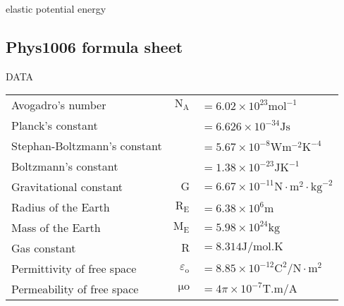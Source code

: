 \documentclass{extarticle}
\begin{document}
elastic potential energy












\subsection{Phys1006 formula sheet}



\begin{tcolorbox}[enhanced jigsaw,sharp corners,coltext=black,colback=BurntOrange!25!white,boxrule=pt,breakable,size=minimal]

DATA

\begin{tabu}{lrl}
Avogadro's number & $\mathrm{N}_{\mathrm{A}}$ & $=6.02 \times 10^{23} \mathrm{mol}^{-1}$ \\

Planck's constant & & $=6.626 \times 10^{-34} \mathrm{J} \mathrm{s}$ \\

Stephan-Boltzmann's constant & & $=5.67 \times 10^{-8} \mathrm{W} \mathrm{m}^{-2} \mathrm{K}^{-4}$ \\

Boltzmann's constant & & $=1.38 \times 10^{-23} \mathrm{J} \mathrm{K}^{-1}$ \\



Gravitational constant & $\mathrm{G}$ & $=6.67 \times 10^{-11} \mathrm{N} \cdot \mathrm{m}^{2} \cdot \mathrm{kg}^{-2}$ \\
Radius of the Earth & $\mathrm{R}_{\mathrm{E}}$ & $=6.38 \times 10^{6} \mathrm{m}$ \\

Mass of the Earth & $\mathrm{M}_{\mathrm{E}}$ & $=5.98 \times 10^{24} \mathrm{kg}$ \\

Gas constant & $\mathrm{R}$ & $=8.314 \mathrm{J} / \mathrm{mol} . \mathrm{K}$ \\

Permittivity of free space & $\varepsilon_{\mathrm{o}}$ & $=8.85 \times 10^{-12} \mathrm{C}^{2} / \mathrm{N} \cdot \mathrm{m}^{2}$ \\

Permeability of free space & $\mathrm{\mu o}$ & $=4 \pi \times 10^{-7} \mathrm{T} . \mathrm{m} / \mathrm{A}$ \\


\end{tabu}
\end{tcolorbox}
\end{document}
